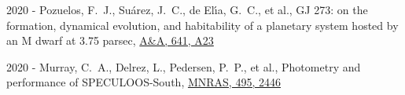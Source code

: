 \documentclass[10pt,letterpaper]{article}
\newcommand{\publi}[4]{\item #1 - #3, #2, #4}
\newcommand{\mnras}{MNRAS}
\newcommand{\aap}{A\&A}
\begin{document}
\begin{etaremune}
    \publi{2020}{GJ 273: on the formation, dynamical evolution, and habitability of a planetary system hosted by an M dwarf at 3.75 parsec}
    {Pozuelos, F.~J., Su{\'a}rez, J.~C., de El{\'\i}a, G.~C., et al.}
    {\href{https://ui.adsabs.harvard.edu/abs/2020A\&A...641A..23P}{\aap, 641, A23}}
    
    \publi{2020}{Photometry and performance of SPECULOOS-South}
    {Murray, C.~A., Delrez, L., Pedersen, P.~P., et al.}
    {\href{https://ui.adsabs.harvard.edu/abs/2020MNRAS.495.2446M}{\mnras, 495, 2446}}
\end{etaremune}
\end{document}
